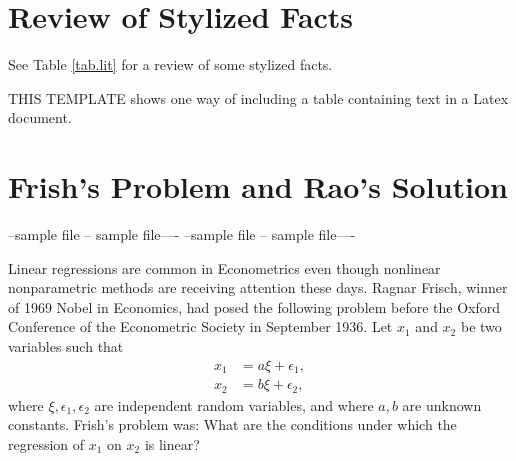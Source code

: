 \documentclass[12pt]{article}
\begin{document}
\section{Review of Stylized Facts}
See Table \ref{tab.lit} for a review of some stylized facts.

THIS TEMPLATE shows one way of including a table containing text
in a Latex document.


\begin{table}[ht]
\caption{Stylized facts of major interest rates in India} 
\centering
{}
 \label{tab.lit}
\end{table}

\section{Frish's Problem and Rao's Solution}
--sample file -- sample file----
--sample file -- sample file----

Linear regressions are common in Econometrics even though
nonlinear nonparametric methods are receiving attention these days.
Ragnar Frisch, winner of 1969 Nobel in Economics,
had posed the following problem before the
Oxford Conference of the Econometric Society in September 1936. Let
$x_1$ and $x_2$ be two variables such that
\begin{eqnarray}
\label{eq.frisch}
x_1 &= a \xi + \epsilon_1, \nonumber \\
x_2 &= b \xi + \epsilon_2,
\end{eqnarray}
where $\xi, \epsilon_1, \epsilon_2$ are independent random variables,
and where $a, b$ are unknown constants.  Frish's problem
was: What are the conditions under which the regression of $x_1$ on
$x_2$ is linear?
\end{document}

